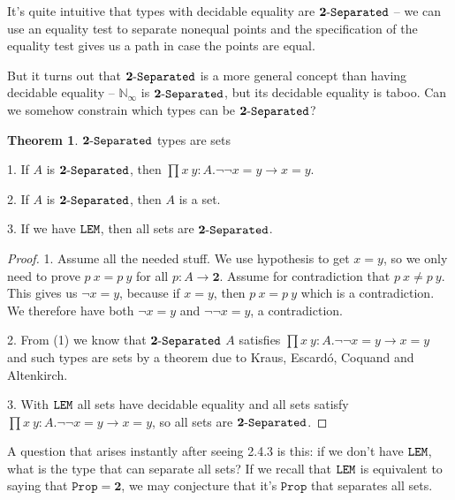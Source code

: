 \documentclass[11pt]{article}
\theoremstyle{definition}
\newtheorem{theorem}{Theorem}[section]
\newcommand{\text}[1]{\texttt{#1}}
\renewcommand{\(}{\left(}
\renewcommand{\)}{\right)}
\newcommand{\Prop}{\text{Prop}}
\newcommand{\apl}[2]{#1\ #2}
\newcommand{\Bool}{\mathbf{2}}
\newcommand{\Conat}{\mathbb{N}_\infty}
\newcommand{\dprod}[2]{\prod #1.#2}
\begin{document}
It's quite intuitive that types with decidable equality are $\Separated{\Bool}$ -- we can use an equality test to separate nonequal points and the specification of the equality test gives us a path in case the points are equal.

But it turns out that $\Separated{\Bool}$ is a more general concept than having decidable equality -- $\Conat$ is $\Separated{\Bool}$, but its decidable equality is taboo. Can we somehow constrain which types can be $\Separated{\Bool}$?

\begin{theorem} $\Separated{\Bool}$ types are sets

1. If $A$ is $\Separated{\Bool}$, then $\dprod{x\ y : A}{\neg\neg x = y \to x = y}$.

2. If $A$ is $\Separated{\Bool}$, then $A$ is a set.

3. If we have $\texttt{LEM}$, then all sets are $\Separated{\Bool}$.

\end{theorem}
\begin{proof}

1. Assume all the needed stuff. We use hypothesis to get $x = y$, so we only need to prove $\apl{p}{x} = \apl{p}{y}$ for all $p : A \to \Bool$. Assume for contradiction that $\apl{p}{x} \neq \apl{p}{y}$. This gives us $\neg x = y$, because if $x = y$, then $\apl{p}{x} = \apl{p}{y}$ which is a contradiction. We therefore have both $\neg x = y$ and $\neg\neg x = y$, a contradiction.

2. From (1) we know that $\Separated{\Bool}$ $A$ satisfies $\dprod{x\ y : A}{\neg\neg x = y \to x = y}$ and such types are sets by a theorem due to Kraus, Escard\'{o}, Coquand and Altenkirch.

3. With $\texttt{LEM}$ all sets have decidable equality and all sets satisfy $\dprod{x\ y : A}{\neg\neg x = y \to x = y}$, so all sets are $\Separated{\Bool}$.
\end{proof}

A question that arises instantly after seeing 2.4.3 is this: if we don't have $\texttt{LEM}$, what is the type that can separate all sets? If we recall that $\texttt{LEM}$ is equivalent to saying that $\Prop = \Bool$, we may conjecture that it's $\Prop$ that separates all sets.
\end{document}

